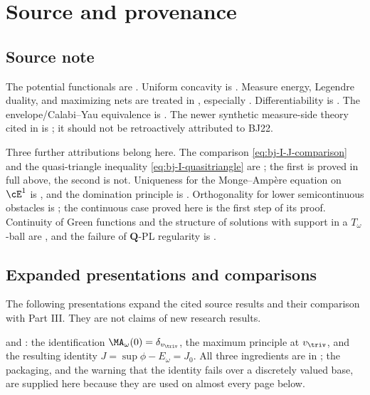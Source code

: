 \section{Source and provenance}
\label{sec:ch47-source}

\subsection{Source note}
\label{sec:ch47-source-note}

The potential functionals are \cite[Definitions~7.24--7.25 and
Proposition~7.27]{BJ22}.  Uniform concavity is \cite[Theorem~7.28]{BJ22}.
Measure energy, Legendre duality, and maximizing nets are treated in
\cite[\S\S9.1--9.3]{BJ22}, especially
\cite[Proposition~9.6 and Theorem~9.11]{BJ22}.  Differentiability is
\cite[Theorem~8.5 and Corollary~8.6]{BJ22}.  The envelope/Calabi--Yau
equivalence is \cite[Theorem~12.8]{BJ22}.
The newer synthetic measure-side theory cited in
 is
\cite{BJ25FiniteEnergy}; it should not be retroactively attributed to BJ22.

Three further attributions belong here.  The comparison
\eqref{eq:bj-I-J-comparison} and the quasi-triangle inequality
\eqref{eq:bj-I-quasitriangle} are \cite[Proposition~7.27 and Theorem~3.31]{BJ22}; the
first is proved in full above, the second is not.  Uniqueness for the
Monge--Amp\`ere equation on $\cE^1$ is \cite[Corollary~10.4]{BJ22}, and
the domination principle is \cite[Corollary~10.6]{BJ22}.
Orthogonality for lower semicontinuous obstacles is
\cite[Theorem~13.1]{BJ22}; the continuous case proved here is the first
step of its proof.  Continuity of Green functions and the structure of
solutions with support in a $T_\omega$-ball are
\cite[Theorem~12.12 and Proposition~12.14]{BJ22}, and the failure of
$\mathbf Q$-PL regularity is \cite[Theorem~60 and Examples~63, 65]{BJGreen24}.

\subsection{Expanded presentations and comparisons}
\label{sec:ch47-additions}

The following presentations expand the cited source results and their
comparison with Part III. They are not claims of new research results.

 and
: the identification
$\MA_\omega(0)=\delta_{v_{\triv}}$, the maximum principle at
$v_{\triv}$, and the resulting identity
$J=\sup\phi-E_\omega=J_0$.  All three ingredients are in
; the packaging, and the warning
that the identity fails over a discretely valued base, are supplied here
because they are used on almost every page below.

